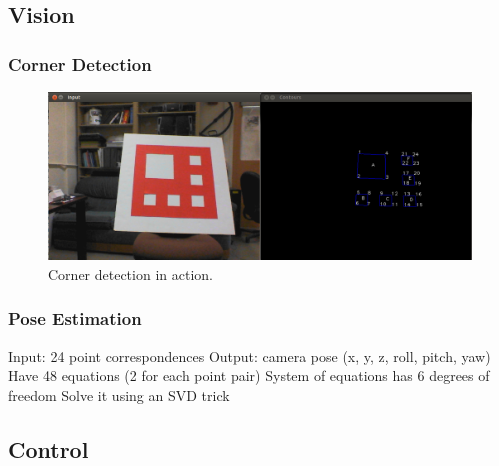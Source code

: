 \documentclass[10pt]{scrartcl} %
\begin{document}



\subsection{Vision}

\subsubsection{Corner Detection}

\begin{figure}[h]
    \centering
    \includegraphics[width=\textwidth]{images/corners.png}
    \caption{Corner detection in action.}
    \label{fig:corners}
\end{figure}

\subsubsection{Pose Estimation}

Input: 24 point correspondences
Output: camera pose (x, y, z, roll, pitch, yaw)
Have 48 equations (2 for each point pair)
System of equations has 6 degrees of freedom
Solve it using an SVD trick


\subsection{Control}

\end{document}
